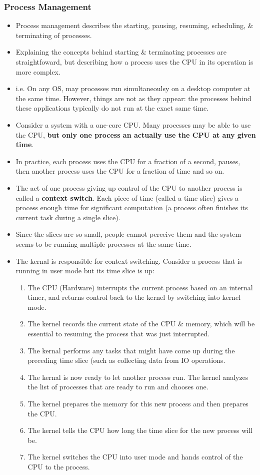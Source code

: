\documentclass{article}
\begin{document}
	\subsubsection{Process Management}
	\begin{itemize}
		\item Process management describes the starting, pausing, resuming, scheduling, \& terminating of processes.
		\item Explaining the concepts behind starting \& terminating processes are straightfoward, but describing how a process uses the CPU in its operation is more complex.
		\item i.e. On any OS, may processes run simultaneoulsy on a desktop computer at the same time. However, things are not as they appear: the processes behind these applications typically do not run at the exact same time.
		\item Consider a system with a one-core CPU. Many processes may be able to use the CPU, {\bf but only one process an actually use the CPU at any given time}.
		\item In practice, each process uses the CPU for a fraction of a second, pauses, then another process uses the CPU for a fraction of time and so on.
		\item The act of one process giving up control of the CPU to another process is called a {\bf context switch}. Each piece of time (called a time slice) gives a process enough time for significant computation (a process often finishes its current task during a single slice).
		\item Since the slices are so small, people cannot perceive them and the system seems to be running multiple processes at the same time.	
		\item The kernal is responsible for context switching. Consider a process that is running in user mode but its time slice is up:
			\begin{enumerate}
				\item The CPU (Hardware) interrupts the current process based on an internal timer, and returns control back to the kernel by switching into kernel mode.
				\item The kernel records the current state of the CPU \& memory, which will be essential to resuming the process that was just interrupted.
				\item The kernal performs any tasks that might have come up during the preceding time slice (such as collecting data from IO operations.
				\item The kernal is now ready to let another process run. The kernel analyzes the list of processes that are ready to run and chooses one.
				\item The kernel prepares the memory for this new process and then prepares the CPU.
				\item The kernel tells the CPU how long the time slice for the new process will be.
				\item The kernel switches the CPU into user mode and hands control of the CPU to the process.
			\end{enumerate}
	\end{itemize}	
\end{document}
